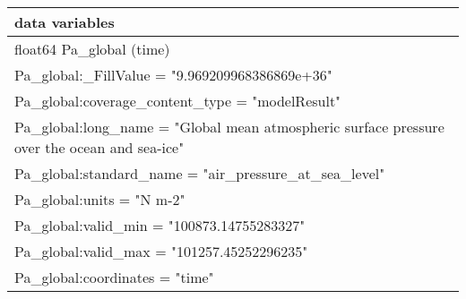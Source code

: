 \begin{longtable}{|p{\textwidth}|}
data variables\\
\hline
\hspace{0.5cm}float64 Pa\_global (time)\\
\hspace{0.5cm}\hspace{0.5cm}Pa\_global:\_FillValue = "9.969209968386869e+36"\\
\hspace{0.5cm}\hspace{0.5cm}Pa\_global:coverage\_content\_type = "modelResult"\\
\hspace{0.5cm}\hspace{0.5cm}Pa\_global:long\_name = "Global mean atmospheric surface pressure over the ocean and sea-ice"\\
\hspace{0.5cm}\hspace{0.5cm}Pa\_global:standard\_name = "air\_pressure\_at\_sea\_level"\\
\hspace{0.5cm}\hspace{0.5cm}Pa\_global:units = "N m-2"\\
\hspace{0.5cm}\hspace{0.5cm}Pa\_global:valid\_min = "100873.14755283327"\\
\hspace{0.5cm}\hspace{0.5cm}Pa\_global:valid\_max = "101257.45252296235"\\
\hspace{0.5cm}\hspace{0.5cm}Pa\_global:coordinates = "time"\\
\hline
\end{longtable}